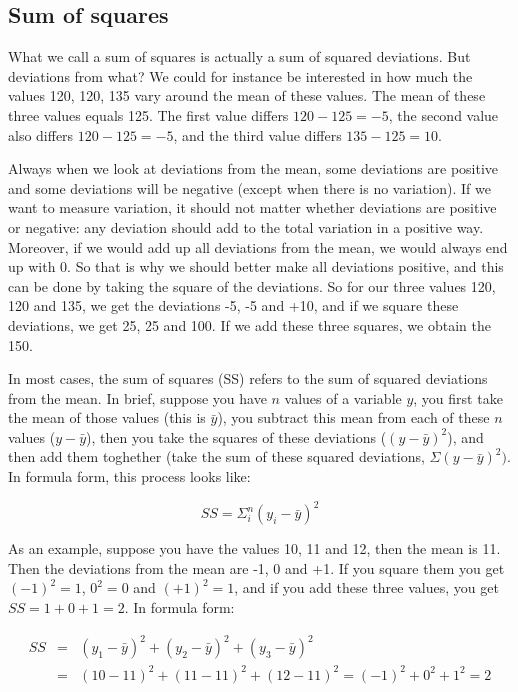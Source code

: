 \documentclass[]{report}\usepackage[]{graphicx}\usepackage[]{color}
\begin{document}
\subsection{Sum of squares}

What we call a sum of squares is actually a sum of squared deviations. But deviations from what? We could for instance be interested in how much the values 120, 120, 135 vary around the mean of these values. The mean of these three values equals 125. The first value differs $120-125= -5$, the second value also differs $120-125= -5$, and the third value differs $135-125= 10$.

Always when we look at deviations from the mean, some deviations are positive and some deviations will be negative (except when there is no variation). If we want to measure variation, it should not matter whether deviations are positive or negative: any deviation should add to the total variation in a positive way. Moreover, if we would add up all deviations from the mean, we would always end up with 0. So that is why we should better make all deviations positive, and this can be done by taking the square of the deviations. So for our three values 120, 120 and 135, we get the deviations -5, -5 and +10, and if we square these deviations, we get 25, 25 and 100. If we add these three squares, we obtain the 150.

In most cases, the sum of squares (SS) refers to the sum of squared deviations from the mean. In brief, suppose you have $n$ values of a variable $y$, you first take the mean of those values (this is $\bar{y}$), you subtract this mean from each of these $n$ values ($y-\bar{y}$), then you take the squares of these deviations ($(y-\bar{y})^2$), and then add them toghether (take the sum of these squared deviations, $\Sigma (y-\bar{y})^2)$. In formula form, this process looks like:

\begin{equation}
SS = \Sigma_i^n (y_i-\bar{y})^2
\end{equation}

As an example, suppose you have the values 10, 11 and 12, then the mean is 11. Then the deviations from the mean are -1, 0 and +1. If you square them you get $(-1)^2=1$, $0^2=0$ and $(+1)^2=1$, and if you add these three values, you get $SS=1+0+1=2$. In formula form:


\begin{eqnarray}
SS &=& (y_1-\bar{y})^2 + (y_2-\bar{y})^2 +(y_3-\bar{y})^2 \\
&=& (10-11)^2 + (11-11)^2 +(12-11)^2 = (-1)^2 + 0^2 + 1^2=2 \nonumber
\end{eqnarray}
\end{document}
